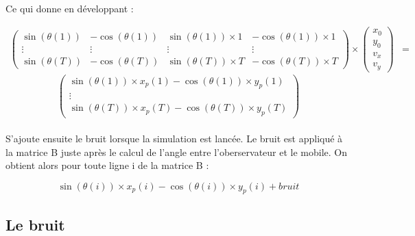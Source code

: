 \documentclass[a4paper,11pt]{article}
\begin{document}
		\paragraph{}
		Ce qui donne en développant :

		\begin{equation}
				\begin{align*}
				\begin{pmatrix}
					\sin(\theta(1)) & -\cos(\theta(1))  & \sin(\theta(1))\times 1 & -\cos(\theta(1))\times 1  \\
					\vdots & \vdots  & \vdots & \vdots  \\
					\sin(\theta(T))  & -\cos(\theta(T))  &  \sin(\theta(T))\times T  &  -\cos(\theta(T))\times T
				\end{pmatrix}
				\times
				\begin{pmatrix}
				 x_0 \\
				 y_0 \\ 
				 v_x \\
				 v_y 
				\end{pmatrix}
				&= 
				\end{align*}
		\end{equation}
		\begin{equation*}
				\begin{pmatrix}
					\sin(\theta(1)) \times x_p(1) - \cos(\theta(1)) \times y_p(1)  \\
					\vdots \\
					\sin(\theta(T)) \times x_p(T) - \cos(\theta(T)) \times y_p(T)  
				\end{pmatrix}
		\end{equation*}

		
		\paragraph{}
		S'ajoute ensuite le bruit lorsque la simulation est lancée.
		Le bruit est appliqué à la matrice B juste après le calcul de l'angle entre l'oberservateur et le mobile. 
		On obtient alors pour toute ligne i de la matrice B :

			\begin{equation} 
				\sin(\theta(i)) \times x_p(i) - \cos(\theta(i)) \times y_p(i) + bruit
			\end{equation}

		
		\subsection{Le bruit}
\end{document}
